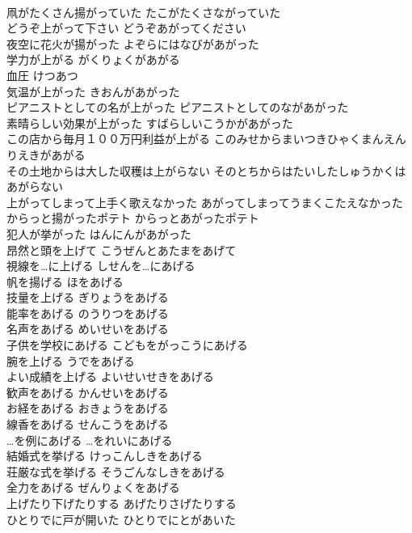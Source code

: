 \documentclass[8pt]{extreport}
\begin{document}
\begin{CJK}{UTF8}{min}
\\	凧がたくさん揚がっていた	たこがたくさながっていた	
\\	どうぞ上がって下さい	どうぞあがってください	
\\	夜空に花火が揚がった	よぞらにはなびがあがった	
\\	学力が上がる	がくりょくがあがる	
\\	血圧	けつあつ	
\\	気温が上がった	きおんがあがった	
\\	ピアニストとしての名が上がった	ピアニストとしてのながあがった	
\\	素晴らしい効果が上がった	すばらしいこうかがあがった	
\\	この店から毎月１００万円利益が上がる	このみせからまいつきひゃくまんえんりえきがあがる	
\\	その土地からは大した収穫は上がらない	そのとちからはたいしたしゅうかくはあがらない	
\\	上がってしまって上手く歌えなかった	あがってしまってうまくこたえなかった	
\\	からっと揚がったポテト	からっとあがったポテト	
\\	犯人が挙がった	はんにんがあがった	
\\	昂然と頭を上げて	こうぜんとあたまをあげて	
\\	視線を…に上げる	しせんを…にあげる	
\\	帆を揚げる	ほをあげる	
\\	技量を上げる	ぎりょうをあげる	
\\	能率をあげる	のうりつをあげる	
\\	名声をあげる	めいせいをあげる	
\\	子供を学校にあげる	こどもをがっこうにあげる	
\\	腕を上げる	うでをあげる	
\\	よい成績を上げる	よいせいせきをあげる	
\\	歓声をあげる	かんせいをあげる	
\\	お経をあげる	おきょうをあげる	
\\	線香をあげる	せんこうをあげる	
\\	…を例にあげる	…をれいにあげる	
\\	結婚式を挙げる	けっこんしきをあげる	
\\	荘厳な式を挙げる	そうごんなしきをあげる	
\\	全力をあげる	ぜんりょくをあげる	
\\	上げたり下げたりする	あげたりさげたりする	
\\	ひとりでに戸が開いた	ひとりでにとがあいた	

\end{CJK}
\end{document}
